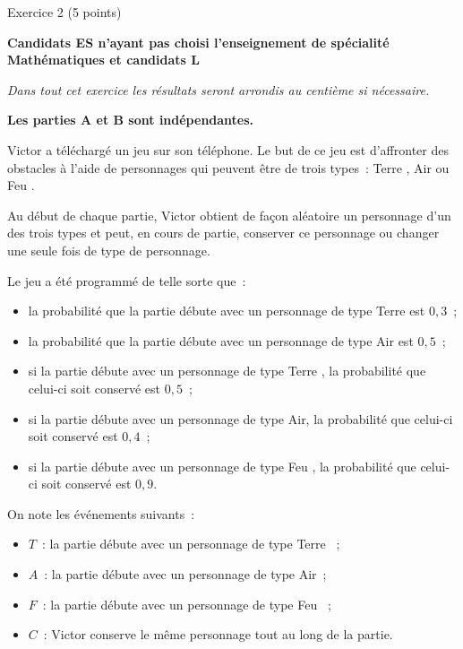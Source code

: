
\begin{h2}Exercice 2 (5 points)\end{h2}
\textbf{Candidats ES n'ayant pas choisi l'enseignement de spécialité \og Mathématiques \fg{}  et candidats L}
\par
\medbreak
\par
\emph{Dans tout cet exercice les résultats seront arrondis au centième si nécessaire.}
\par
\medbreak
\par
\textbf{Les parties A et B sont indépendantes.}
\par
\medbreak
{}
\medbreak
\par
Victor a téléchargé un jeu sur son téléphone. Le but de ce jeu est d'affronter des obstacles à l'aide de personnages qui peuvent être de trois types~: \og Terre \fg, \og Air\fg{} ou \og Feu \fg.
\par
Au début de chaque partie, Victor obtient de façon aléatoire un personnage d'un des trois
types et peut, en cours de partie, conserver ce personnage ou changer une seule fois de type de personnage.
\par
Le jeu a été programmé de telle sorte que~:
\begin{itemize}
     \item la probabilité que la partie débute avec un personnage de type \og Terre\fg{} est $0,3$~;
     \item la probabilité que la partie débute avec un personnage de type \og Air\fg{} est $0,5$~;
     \item si la partie débute avec un personnage de type \og Terre \fg, la probabilité que celui-ci soit conservé est $0,5$~;
     \item si la partie débute avec un personnage de type \og Air\fg, la probabilité que celui-ci soit conservé est $0,4$~;
     \item si la partie débute avec un personnage de type \og Feu \fg, la probabilité que celui-ci soit conservé est $0,9$.
\end{itemize}
\par
On note les événements suivants~:
\begin{itemize}
     \item $T$~: la partie débute avec un personnage de type \og Terre \fg{}~;
     \item $A$~: la partie débute avec un personnage de type \og Air\fg{}~;
     \item $F$~: la partie débute avec un personnage de type \og Feu \fg{}~;
     \item $C$~: Victor conserve le même personnage tout au long de la partie.
\end{itemize}
